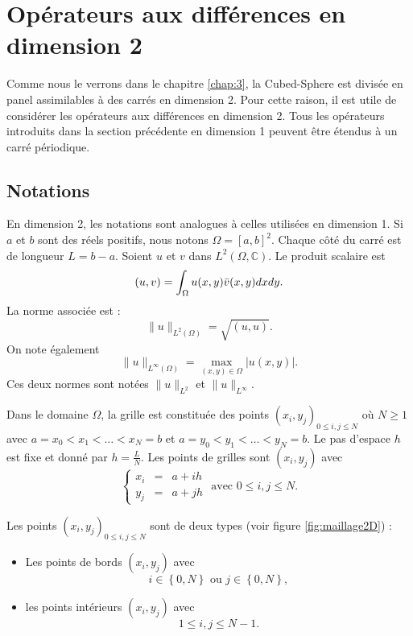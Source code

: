 \section{Opérateurs aux différences en dimension 2}

Comme nous le verrons dans le chapitre \ref{chap:3}, la Cubed-Sphere est divisée en panel assimilables à des carrés en dimension 2. Pour cette raison, il est utile de considérer les opérateurs aux différences en dimension 2. Tous les opérateurs introduits dans la section précédente en dimension 1 peuvent être étendus à un carré périodique.


\subsection{Notations}
\label{sec:notation_2D}

En dimension 2, les notations sont analogues à celles utilisées en dimension 1. Si $a$ et $b$ sont des réels positifs, nous notons $\Omega = [a,b]^2$. Chaque côté du carré est de longueur $L=b-a$. Soient $u$ et $v$ dans $L^2(\Omega, \mathbb{C})$. Le produit scalaire est
\begin{equation}
(u,v) = \displaystyle\int_{\Omega} u(x,y) \bar{v}(x,y) dx dy.
\end{equation}
La norme associée est :
\begin{equation}
\| u \|_{L^2(\Omega)} = \sqrt{(u,u)}. 
\end{equation}
On note également
\begin{equation}
\| u \|_{L^{\infty} ( \Omega )} = \max_{(x,y) \in \Omega} |u(x,y)|.
\end{equation}
Ces deux normes sont notées $\| u \|_{L^2}$ et $\| u \|_{L^{\infty}}$.

Dans le domaine $\Omega$, la grille est constituée des points $(x_i,y_j)_{0 \leq i,j \leq N}$ où $N \geq 1$ avec $a = x_0 < x_1 < \ldots < x_N = b$ et $a = y_0 < y_1 < \ldots < y_N = b$. Le pas d'espace $h$ est fixe et donné par $h = \frac{L}{N}$. Les points de grilles sont $(x_i, y_j)$ avec 
\begin{equation}
\left\lbrace\begin{array}{rcl}
x_i & = & a + i h \\
y_j & = & a + j h 
\end{array}\right. \text{ avec } 0 \leq i,j \leq N.
\end{equation}

Les points $(x_i,y_j)_{0 \leq i,j \leq N}$ sont de deux types (voir figure \ref{fig:maillage2D}) :
\begin{itemize}
\item Les points de bords $(x_i, y_j)$ avec
\begin{equation}
i \in \left\lbrace 0 , N \right\rbrace \text{ ou } j \in \left\lbrace 0 , N \right\rbrace,
\end{equation}
\item les points intérieurs $(x_i, y_j)$ avec
\begin{equation}
1 \leq i,j \leq N-1.
\end{equation}
\end{itemize}




